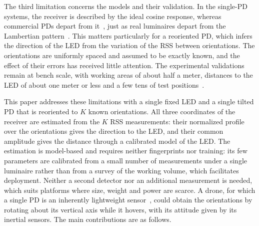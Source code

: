 The third limitation concerns the models and their validation. In the single-PD systems, the receiver is described by the ideal cosine response, whereas commercial PDs depart from it~\cite{Bastiaens2020}, just as real luminaires depart from the Lambertian pattern~\cite{Ding2016}. This matters particularly for a reoriented PD, which infers the direction of the LED from the variation of the RSS between orientations. The orientations are uniformly spaced and assumed to be exactly known, and the effect of their errors has received little attention. The experimental validations remain at bench scale, with working areas of about half a meter, distances to the LED of about one meter or less and a few tens of test positions~\cite{Huang2015,Shi2025,Wang2024}.

This paper addresses these limitations with a single fixed LED and a single tilted PD that is reoriented to $K$ known orientations. All three coordinates of the receiver are estimated from the $K$ RSS measurements: their normalized profile over the orientations gives the direction to the LED, and their common amplitude gives the distance through a calibrated model of the LED. The estimation is model-based and requires neither fingerprints nor training: its few parameters are calibrated from a small number of measurements under a single luminaire rather than from a survey of the working volume, which facilitates deployment. Neither a second detector nor an additional measurement is needed, which suits platforms where size, weight and power are scarce. A drone, for which a single PD is an inherently lightweight sensor~\cite{Bastiaens2021}, could obtain the orientations by rotating about its vertical axis while it hovers, with its attitude given by its inertial sensors. The main contributions are as follows.

